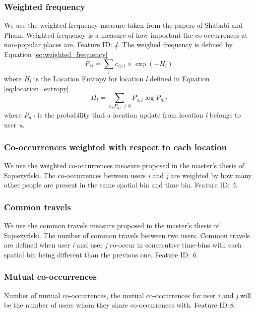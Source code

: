 \subsubsection{Weighted frequency}
We use the weighted frequency measure taken from the papers of Shababi and Pham\cite{iRWRfSD}\cite{AEBMtISSfSD}.
Weighted frequency is a measure of how important the co-occurrences at non-popular places are. Feature ID: \textit{4}.
The weighed frequency is defined by Equation \ref{eq:weighted_frequency}
\begin{equation}
\label{eq:weighted_frequency}
F_{ij}=\sum\limits_{l}c_{ij,l} \times \exp(-H_l)
\end{equation}
where $H_l$ is the Location Entropy for location \textit{l} defined in Equation \ref{eq:location_entropy}
\begin{equation}
\label{eq:location_entropy}
H_l = \sum\limits_{u, P_{u,l}\neq0} P_{u,l}\log P_{u,l}
\end{equation}
where $P_{u,l}$ is the probability that a location update from location \textit{l} belongs to user \textit{u}.

\subsubsection{Co-occurrences weighted with respect to each location}
We use the weighted co-occurrences measure proposed in the master's thesis of Sapieżyński\cite{IMM2013-06556}.
The co-occurrences between users \textit{i} and \textit{j} are weighted by how many other people are present in the same spatial bin and time bin.
Feature ID: \textit{5}.

\subsubsection{Common travels}
We use the common travels measure proposed in the master's thesis of Sapieżyński\cite{IMM2013-06556}.
The number of common travels between two users. Common travels are defined when user \textit{i} and user \textit{j} co-occur in consecutive time-bins with each spatial bin being different than the previous one. Feature ID: \textit{6}.

\subsubsection{Mutual co-occurrences}
Number of mutual co-occurrences, the mutual co-occurrences for user \textit{i} and \textit{j} will be the number of users whom they share co-occurrences with. Feature ID:\textit{8}.

